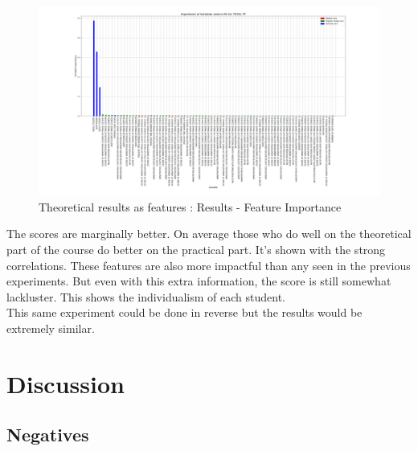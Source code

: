 \documentclass[a4paper,11pt]{report}
\numberwithin{figure}{section} %
\begin{document}
      \begin{figure}[H]
      \centering
      \includegraphics[width=.95\linewidth]{plots/test2_var_importance_TOTAL_TP_2018-05-18_02_51_43.png}
      \caption{Theoretical results as features : Results - Feature Importance}
      \label{fig:test2_2}
      \end{figure}
    The scores are marginally better.
    On average those who do well on the theoretical part of the course do better on the practical part.
    It's shown with the strong correlations.
    These features are also more impactful than any seen in the previous experiments.
    But even with this extra information, the score is still somewhat lackluster.
    This shows the individualism of each student.\\

    This same experiment could be done in reverse but the results would be extremely similar.
    
\chapter{Discussion} \label{Discussion}

    \section{Negatives}
\end{document}
